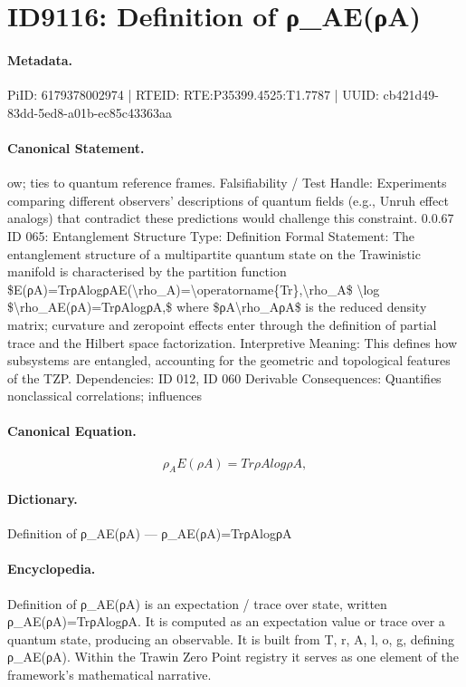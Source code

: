 \section*{ID9116: Definition of ρ\_AE(ρA)}
\paragraph{Metadata.}
PiID: 6179378002974 | RTEID: RTE:P35399.4525:T1.7787 | UUID: cb421d49-83dd-5ed8-a01b-ec85c43363aa

\paragraph{Canonical Statement.}
ow; ties to quantum reference frames. Falsifiability / Test Handle: Experiments comparing different observers’ descriptions of quantum fields (e.g., Unruh effect analogs) that contradict these predictions would challenge this constraint. 0.0.67 ID 065: Entanglement Structure Type: Definition Formal Statement: The entanglement structure of a multipartite quantum state on the Trawinistic manifold is characterised by the partition function \$E(ρA)=TrρAlogρAE(\textbackslash{}rho\_A)=\textbackslash{}operatorname\{Tr\},\textbackslash{}rho\_A\$ \textbackslash{}log \$\textbackslash{}rho\_AE(ρA)=TrρAlogρA,\$ where \$ρA\textbackslash{}rho\_AρA\$ is the reduced density matrix; curvature and zeropoint effects enter through the definition of partial trace and the Hilbert space factorization. Interpretive Meaning: This defines how subsystems are entangled, accounting for the geometric and topological features of the TZP. Dependencies: ID 012, ID 060 Derivable Consequences: Quantifies nonclassical correlations; influences

\paragraph{Canonical Equation.}
\[
\rho_AE(ρA)=TrρAlogρA,
\]

\paragraph{Dictionary.}
Definition of ρ\_AE(ρA) — ρ\_AE(ρA)=TrρAlogρA

\paragraph{Encyclopedia.}
Definition of ρ\_AE(ρA) is an expectation / trace over state, written ρ\_AE(ρA)=TrρAlogρA. It is computed as an expectation value or trace over a quantum state, producing an observable. It is built from T, r, A, l, o, g, defining ρ\_AE(ρA). Within the Trawin Zero Point registry it serves as one element of the framework's mathematical narrative.
